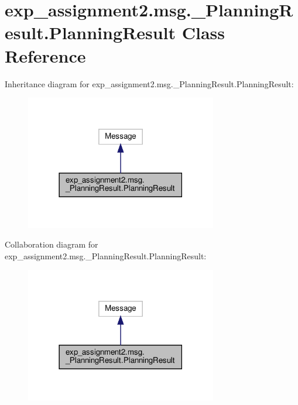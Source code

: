 \hypertarget{classexp__assignment2_1_1msg_1_1__PlanningResult_1_1PlanningResult}{}\section{exp\+\_\+assignment2.\+msg.\+\_\+\+Planning\+Result.\+Planning\+Result Class Reference}
\label{classexp__assignment2_1_1msg_1_1__PlanningResult_1_1PlanningResult}


Inheritance diagram for exp\+\_\+assignment2.\+msg.\+\_\+\+Planning\+Result.\+Planning\+Result\+:
\nopagebreak
\begin{figure}[H]
\begin{center}
\leavevmode
\includegraphics[width=237pt]{classexp__assignment2_1_1msg_1_1__PlanningResult_1_1PlanningResult__inherit__graph}
\end{center}
\end{figure}


Collaboration diagram for exp\+\_\+assignment2.\+msg.\+\_\+\+Planning\+Result.\+Planning\+Result\+:
\nopagebreak
\begin{figure}[H]
\begin{center}
\leavevmode
\includegraphics[width=237pt]{classexp__assignment2_1_1msg_1_1__PlanningResult_1_1PlanningResult__coll__graph}
\end{center}
\end{figure}
